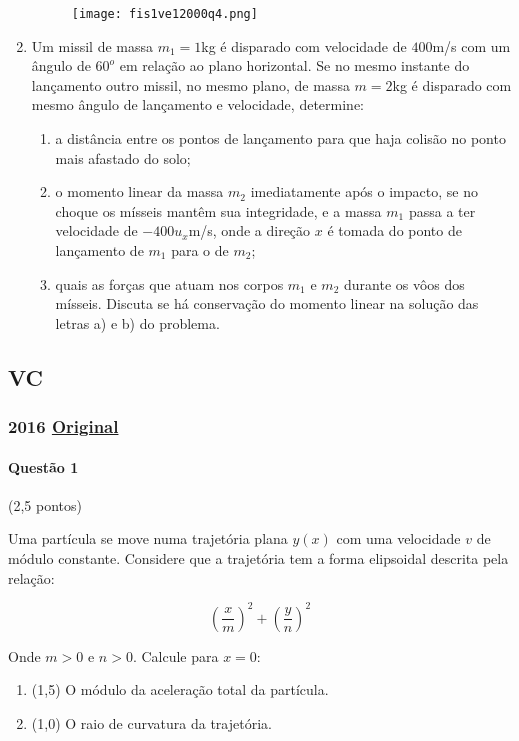 \documentclass[12pt,a4paper]{article}
\newcommand{\original}[1]{\tiny \href{#1}{Original} \normalsize}
\begin{document}
\begin{enumerate}
\begin{figure}[ht]
\centering
\texttt{[image: fis1ve12000q4.png]}
\end{figure}

\item Um missil de massa $m_1=1$kg é disparado com velocidade de $400$m/s com um ângulo de $60^o$ em relação ao plano horizontal. Se no mesmo instante do lançamento outro missil,
no mesmo plano, de massa $m=2$kg é disparado com mesmo ângulo de lançamento e velocidade, determine:
\begin{enumerate}[label=\alph*)]
\item a distância entre os pontos de lançamento para que haja colisão no ponto mais afastado do solo;
\item o momento linear da massa $m_2$ imediatamente após o impacto, se no choque os mísseis mantêm sua integridade, e a massa $m_1$
passa a ter velocidade de $-400 u_x$m/s, onde a direção $x$ é tomada do ponto de lançamento de $m_1$ para o de $m_2$;
\item quais as forças que atuam nos corpos $m_1$ e $m_2$ durante os vôos dos mísseis. Discuta se há conservação do momento linear 
na solução das letras a) e b) do problema.
\end{enumerate}

\end{enumerate}

\newpage
\subsection{VC}
\subsubsection{2016 \original{https://drive.google.com/file/d/1CWmNZs__Zg8e2EggOGfoaTazIz2uXSIU/view?usp=sharing}}

\paragraph{Questão 1} (2,5 pontos)

Uma partícula se move numa trajetória plana $y(x)$ com uma velocidade $v$ de módulo constante. Considere que a trajetória tem a forma elipsoidal descrita pela relação:

$$\left(\frac x m\right)^2+\left(\frac y n\right)^2$$

Onde $m>0$ e $n>0$. Calcule para $x=0$:

\begin{enumerate}[label=(\alph*)]

\item (1,5) O módulo da aceleração total da partícula.

\item (1,0) O raio de curvatura da trajetória.

\end{enumerate}
\end{document}
